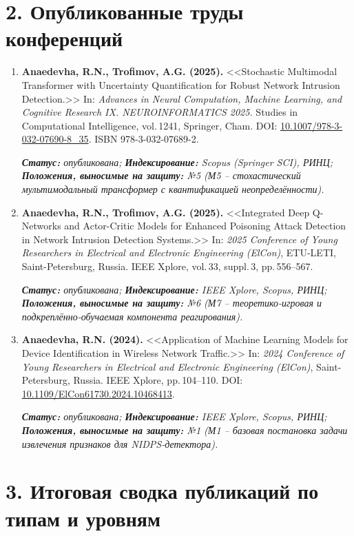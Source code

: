 \documentclass[11pt,a4paper]{article}
\newcommand{\pubmeta}[3]{%
  \par\smallskip\textit{\small\textbf{Статус:} #1; \textbf{Индексирование:} #2; \textbf{Положения, выносимые на защиту:} #3.}\par}
\begin{document}
\section*{2. Опубликованные труды конференций}

\begin{enumerate}[leftmargin=*, itemsep=0.3em, resume]

\item \textbf{Anaedevha, R.N., Trofimov, A.G. (2025).} <<Stochastic Multimodal Transformer with Uncertainty Quantification for Robust Network Intrusion Detection.>> In: \textit{Advances in Neural Computation, Machine Learning, and Cognitive Research IX. NEUROINFORMATICS 2025.} Studies in Computational Intelligence, vol.\,1241, Springer, Cham. DOI: \href{https://doi.org/10.1007/978-3-032-07690-8_35}{10.1007/978-3-032-07690-8\_35}. ISBN 978-3-032-07689-2.
\pubmeta{опубликована}{Scopus (Springer SCI), РИНЦ}{№5 (М5 -- стохастический мультимодальный трансформер с квантификацией неопределённости)}

\item \textbf{Anaedevha, R.N., Trofimov, A.G. (2025).} <<Integrated Deep Q-Networks and Actor-Critic Models for Enhanced Poisoning Attack Detection in Network Intrusion Detection Systems.>> In: \textit{2025 Conference of Young Researchers in Electrical and Electronic Engineering (ElCon)}, ETU-LETI, Saint-Petersburg, Russia. IEEE Xplore, vol.\,33, suppl.\,3, pp.\,556--567.
\pubmeta{опубликована}{IEEE Xplore, Scopus, РИНЦ}{№6 (М7 -- теоретико-игровая и подкреплённо-обучаемая компонента реагирования)}

\item \textbf{Anaedevha, R.N. (2024).} <<Application of Machine Learning Models for Device Identification in Wireless Network Traffic.>> In: \textit{2024 Conference of Young Researchers in Electrical and Electronic Engineering (ElCon)}, Saint-Petersburg, Russia. IEEE Xplore, pp.\,104--110. DOI: \href{https://doi.org/10.1109/ElCon61730.2024.10468413}{10.1109/ElCon61730.2024.10468413}.
\pubmeta{опубликована}{IEEE Xplore, Scopus, РИНЦ}{№1 (М1 -- базовая постановка задачи извлечения признаков для NIDPS-детектора)}

\end{enumerate}

\vspace{-0.2cm}

\section*{3. Итоговая сводка публикаций по типам и уровням}
\end{document}
